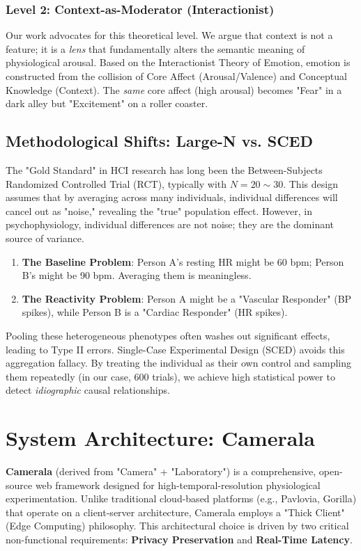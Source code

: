 \documentclass[journal]{IEEEtran}
\begin{document}
\subsubsection{Level 2: Context-as-Moderator (Interactionist)}
Our work advocates for this theoretical level. We argue that context is not a feature; it is a \textit{lens} that fundamentally alters the semantic meaning of physiological arousal.
Based on the Interactionist Theory of Emotion, emotion is constructed from the collision of Core Affect (Arousal/Valence) and Conceptual Knowledge (Context). The \textit{same} core affect (high arousal) becomes "Fear" in a dark alley but "Excitement" on a roller coaster.

\subsection{Methodological Shifts: Large-N vs. SCED}
The "Gold Standard" in HCI research has long been the Between-Subjects Randomized Controlled Trial (RCT), typically with $N=20 \sim 30$. This design assumes that by averaging across many individuals, individual differences will cancel out as "noise," revealing the "true" population effect.
However, in psychophysiology, individual differences are not noise; they are the dominant source of variance.
\begin{enumerate}
    \item \textbf{The Baseline Problem}: Person A's resting HR might be 60 bpm; Person B's might be 90 bpm. Averaging them is meaningless.
    \item \textbf{The Reactivity Problem}: Person A might be a "Vascular Responder" (BP spikes), while Person B is a "Cardiac Responder" (HR spikes).
\end{enumerate}
Pooling these heterogeneous phenotypes often washes out significant effects, leading to Type II errors.
Single-Case Experimental Design (SCED) \cite{barlow_sced} avoids this aggregation fallacy. By treating the individual as their own control and sampling them repeatedly (in our case, 600 trials), we achieve high statistical power to detect \textit{idiographic} causal relationships.

\section{System Architecture: Camerala}
\textbf{Camerala} (derived from "Camera" + "Laboratory") is a comprehensive, open-source web framework designed for high-temporal-resolution physiological experimentation. Unlike traditional cloud-based platforms (e.g., Pavlovia, Gorilla) that operate on a client-server architecture, Camerala employs a "Thick Client" (Edge Computing) philosophy. This architectural choice is driven by two critical non-functional requirements: \textbf{Privacy Preservation} and \textbf{Real-Time Latency}.
\end{document}
